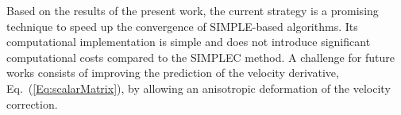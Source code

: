 \documentclass[final,3p,times,11pt,onecolumn]{myElsarticle}
\numberwithin{equation}{section}
\begin{document}
Based on the results of the present work, the current strategy is a promising technique to speed up the convergence of SIMPLE-based algorithms. Its computational implementation is simple and does not introduce significant computational costs compared to the SIMPLEC method. 
A challenge for future works consists of improving the prediction of the velocity derivative, Eq.~(\ref{Eq:scalarMatrix}), by allowing an anisotropic deformation of the velocity correction. %



\end{document}
